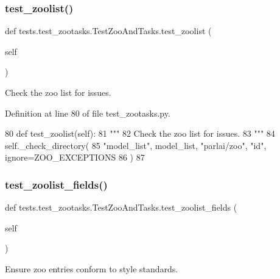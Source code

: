 \subsubsection{\texorpdfstring{test\+\_\+zoolist()}{test\_zoolist()}}
{\footnotesize\ttfamily def tests.\+test\+\_\+zootasks.\+Test\+Zoo\+And\+Tasks.\+test\+\_\+zoolist (\begin{DoxyParamCaption}\item[{}]{self }\end{DoxyParamCaption})}

\begin{DoxyVerb}Check the zoo list for issues.
\end{DoxyVerb}
 

Definition at line 80 of file test\+\_\+zootasks.\+py.


\begin{DoxyCode}
80     \textcolor{keyword}{def }test\_zoolist(self):
81         \textcolor{stringliteral}{"""}
82 \textcolor{stringliteral}{        Check the zoo list for issues.}
83 \textcolor{stringliteral}{        """}
84         self.\_check\_directory(
85             \textcolor{stringliteral}{"model\_list"}, model\_list, \textcolor{stringliteral}{"parlai/zoo"}, \textcolor{stringliteral}{"id"}, ignore=ZOO\_EXCEPTIONS
86         )
87 
\end{DoxyCode}
\mbox{\label{classtests_1_1test__zootasks_1_1TestZooAndTasks_a57e8f4db75b9eb31263d4e269c40068f}} 
\subsubsection{\texorpdfstring{test\+\_\+zoolist\+\_\+fields()}{test\_zoolist\_fields()}}
{\footnotesize\ttfamily def tests.\+test\+\_\+zootasks.\+Test\+Zoo\+And\+Tasks.\+test\+\_\+zoolist\+\_\+fields (\begin{DoxyParamCaption}\item[{}]{self }\end{DoxyParamCaption})}

\begin{DoxyVerb}Ensure zoo entries conform to style standards.
\end{DoxyVerb}
 

